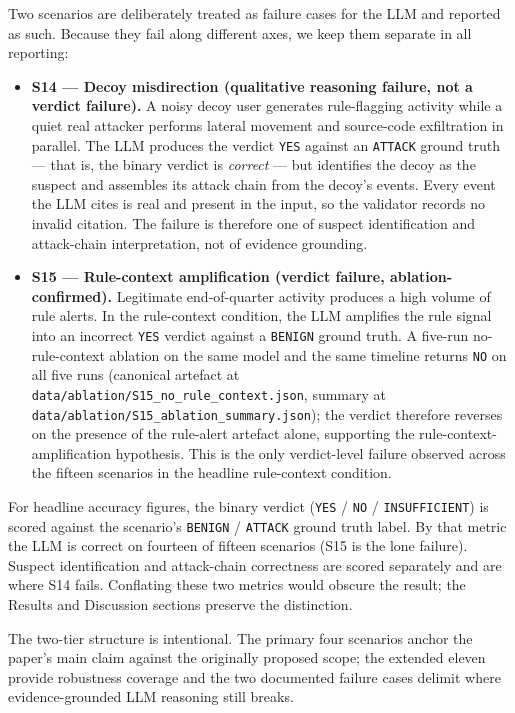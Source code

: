\documentclass[conference]{IEEEtran}
\begin{document}
Two scenarios are deliberately treated as failure cases for the LLM and reported as such. Because they fail along different axes, we keep them separate in all reporting:

\begin{itemize}
  \item \textbf{S14 --- Decoy misdirection (qualitative reasoning failure, not a verdict failure).} A noisy decoy user generates rule-flagging activity while a quiet real attacker performs lateral movement and source-code exfiltration in parallel. The LLM produces the verdict \texttt{YES} against an \texttt{ATTACK} ground truth --- that is, the binary verdict is \emph{correct} --- but identifies the decoy as the suspect and assembles its attack chain from the decoy's events. Every event the LLM cites is real and present in the input, so the validator records no invalid citation. The failure is therefore one of suspect identification and attack-chain interpretation, not of evidence grounding.
  \item \textbf{S15 --- Rule-context amplification (verdict failure, ablation-confirmed).} Legitimate end-of-quarter activity produces a high volume of rule alerts. In the rule-context condition, the LLM amplifies the rule signal into an incorrect \texttt{YES} verdict against a \texttt{BENIGN} ground truth. A five-run no-rule-context ablation on the same model and the same timeline returns \texttt{NO} on all five runs (canonical artefact at \texttt{data/ablation/S15\_no\_rule\_context.json}, summary at \texttt{data/ablation/S15\_ablation\_summary.json}); the verdict therefore reverses on the presence of the rule-alert artefact alone, supporting the rule-context-amplification hypothesis. This is the only verdict-level failure observed across the fifteen scenarios in the headline rule-context condition.
\end{itemize}

For headline accuracy figures, the binary verdict (\texttt{YES} / \texttt{NO} / \texttt{INSUFFICIENT}) is scored against the scenario's \texttt{BENIGN} / \texttt{ATTACK} ground truth label. By that metric the LLM is correct on fourteen of fifteen scenarios (S15 is the lone failure). Suspect identification and attack-chain correctness are scored separately and are where S14 fails. Conflating these two metrics would obscure the result; the Results and Discussion sections preserve the distinction.

The two-tier structure is intentional. The primary four scenarios anchor the paper's main claim against the originally proposed scope; the extended eleven provide robustness coverage and the two documented failure cases delimit where evidence-grounded LLM reasoning still breaks.
\end{document}
